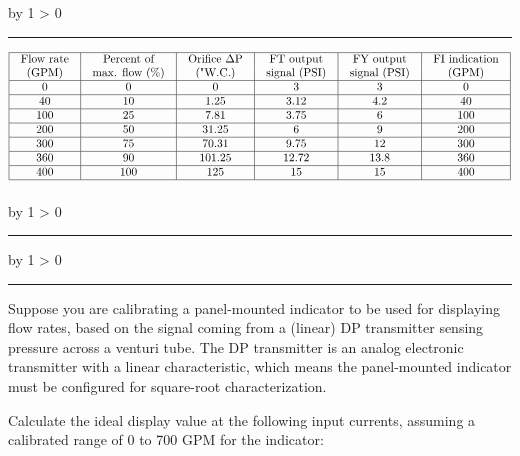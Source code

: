 \documentclass[12pt,a4paper]{article}
\def\oppgave{
            \advance\questnum by 1
            \ifnum \questnum > 0
                 \hrule
                 \vskip 3pt
                 \leftline{Oppgave \the\questnum}
                 \vskip 3pt \fi}
\def\svar{
           \advance\answnum by 1
           \ifnum \answnum > 0
                \hrule
                \vskip 3pt
                \leftline{Svar \the\answnum}
                \vskip 3pt \fi}
\def\notes{
           \advance\explnum by 1
           \ifnum \explnum > 0
                \hrule
                \vskip 3pt
                \leftline{Notes \the\explnum}
                \vskip 3pt \fi}
\begin{document}
\vskip 10pt \filbreak 





\svar{} 


$$\vbox{\offinterlineskip
\halign{\strut
\vrule \quad\hfil # \ \hfil & 
\vrule \quad\hfil # \ \hfil & 
\vrule \quad\hfil # \ \hfil & 
\vrule \quad\hfil # \ \hfil & 
\vrule \quad\hfil # \ \hfil & 
\vrule \quad\hfil # \ \hfil \vrule \cr
\noalign{\hrule}
%
Flow rate & Percent of & Orifice $\Delta$P & FT output & FY output & FI indication \cr
%
(GPM) & max. flow (\%) & ("W.C.) & signal (PSI) & signal (PSI) & (GPM) \cr
%
\noalign{\hrule}
%
0 & 0 & 0 & 3 & 3 & 0 \cr
%
\noalign{\hrule}
%
40 & 10 & 1.25 & 3.12 & 4.2 & 40 \cr
%
\noalign{\hrule}
%
100 & 25 & 7.81 & 3.75 & 6 & 100 \cr
%
\noalign{\hrule}
%
200 & 50 & 31.25 & 6 & 9 & 200 \cr
%
\noalign{\hrule}
%
300 & 75 & 70.31 & 9.75 & 12 & 300 \cr
%
\noalign{\hrule}
%
360 & 90 & 101.25 & 12.72 & 13.8 & 360 \cr
%
\noalign{\hrule}
%
400 & 100 & 125 & 15 & 15 & 400 \cr
%
\noalign{\hrule}
} %
}$$ %


\vskip 10pt \filbreak 





\notes{} 


\vfil \eject 


\oppgave{} 

Suppose you are calibrating a panel-mounted indicator to be used for displaying flow rates, based on the signal coming from a (linear) DP transmitter sensing pressure across a venturi tube.  The DP transmitter is an analog electronic transmitter with a linear characteristic, which means the panel-mounted indicator must be configured for square-root characterization.

Calculate the ideal display value at the following input currents, assuming a calibrated range of 0 to 700 GPM for the indicator:
\end{document}
